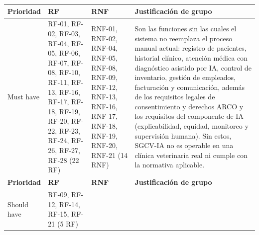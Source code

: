 \documentclass[
]{article}
\newcounter{none} %
\begin{document}
{\def\LTcaptype{none} %
\begin{longtable}[]{|
  >{\centering\arraybackslash}p{}|
  >{\raggedright\arraybackslash}p{}|
  >{\raggedright\arraybackslash}p{}|
  >{\raggedright\arraybackslash}p{}|}
\hline
\begin{minipage}[b]{\linewidth}\centering
\textbf{Prioridad}
\end{minipage} & \begin{minipage}[b]{\linewidth}\centering
\textbf{RF}
\end{minipage} & \begin{minipage}[b]{\linewidth}\centering
\textbf{RNF}
\end{minipage} & \begin{minipage}[b]{\linewidth}\centering
\textbf{Justificación de grupo}
\end{minipage} \\
\hline
\endhead
\hline
\endlastfoot
Must have & \begin{minipage}[t]{\linewidth}\raggedright
RF-01, RF-02, RF-03, RF-04, RF-05, RF-06, RF-07, RF-08, RF-10, RF-11,
RF-13, RF-16, RF-17, RF-18, RF-19, RF-20, RF-22, RF-23, RF-24, RF-26,
RF-27, RF-28 (22 RF)
\end{minipage} &
\begin{minipage}[t]{\linewidth}\raggedright
RNF-01, RNF-02, RNF-04, RNF-05, RNF-08, RNF-09, RNF-12, RNF-13,
RNF-16, RNF-17, RNF-18, RNF-19, RNF-20, RNF-21 (14 RNF)
\end{minipage} & Son las funciones sin las cuales el sistema no
reemplaza el proceso manual actual: registro de pacientes, historial
clínico, atención médica con diagnóstico asistido por IA, control de
inventario, gestión de empleados, facturación y comunicación, además
de los requisitos legales de consentimiento y derechos ARCO y los
requisitos del componente de IA (explicabilidad, equidad, monitoreo y
supervisión humana). Sin estos, SGCV-IA no es operable en una clínica
veterinaria real ni cumple con la normativa aplicable. \\
\hline
\textbf{Prioridad} & \textbf{RF} & \textbf{RNF} & \textbf{Justificación
de grupo} \\
\hline
Should have & \begin{minipage}[t]{\linewidth}\raggedright
RF-09, RF-12, RF-14, RF-15, RF-21 (5 RF)
\end{minipage} & \begin{minipage}[t]{\linewidth}\raggedright

\end{minipage}
\end{longtable}}
\end{document}

